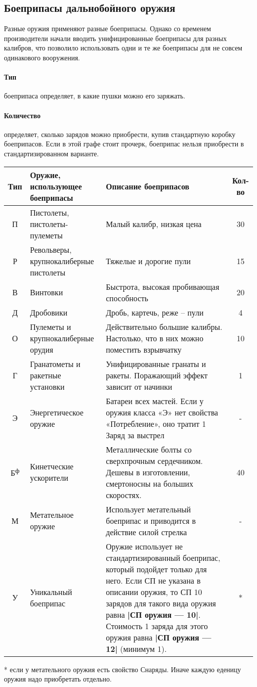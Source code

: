 \subsection{Боеприпасы дальнобойного оружия}
Разные оружия применяют разные боеприпасы. Однако со временем производители начали вводить унифицированные боеприпасы для разных калибров, что позволило использовать одни и те же боеприпасы для не совсем одинакового вооружения.
\paragraph{Тип} боеприпаса определяет, в какие пушки можно его заряжать.
\paragraph{Количество} определяет, сколько зарядов можно приобрести, купив стандартную коробку боеприпасов. Если в этой графе стоит прочерк, боеприпас нельзя приобрести в стандартизированном варианте.
\begin{center}\begin{tabular}{|c|p{3cm}|p{10cm}|c|}
\hline
Тип & Оружие, использующее боеприпасы & Описание боеприпасов & Кол-во\\ \hline
П & Пистолеты, пистолеты-пулеметы & Малый калибр, низкая цена & 30 \\ \hline
Р & Револьверы, крупнокалиберные пистолеты & Тяжелые и дорогие пули & 15 \\ \hline
В & Винтовки & Быстрота, высокая пробивающая способность & 20 \\ \hline
Д & Дробовики & Дробь, картечь, реже – пули & 4 \\ \hline
О & Пулеметы и крупнокалиберные орудия & Действительно большие калибры. Настолько, что в них можно поместить взрывчатку & 10 \\ \hline
Г & Гранатометы и ракетные установки & Унифицированные гранаты и ракеты. Поражающий эффект зависит от начинки & 1 \\ \hline
Э & Энергетическое оружие & Батареи всех мастей. Если у оружия класса «Э» нет свойства «Потребление», оно тратит 1 Заряд за выстрел & - \\ \hline
Б\textsuperscript{ф} & Кинетческие ускорители & Металлические болты со сверхпрочным сердечником. Дешевы в изготовлении, смертоносны на больших скоростях. & 40 \\ \hline
М & Метательное оружие & Использует метательный боеприпас и приводится в действие силой стрелка & - \\ \hline
У & Уникальный боеприпас & Оружие использует не стандартизированный боеприпас, который подойдет только для него. Если СП не указана в описании оружия, то СП 10 зарядов для такого вида оружия равна \textbf{|СП оружия — 10|}. Стоимость 1 заряда для этого оружия равна \textbf{|СП оружия — 12|} (минимум 1). & * \\ \hline
\end{tabular}\end{center}
* если у метательного оружия есть свойство Снаряды. Иначе каждую еденицу оружия надо приобретать отдельно.

